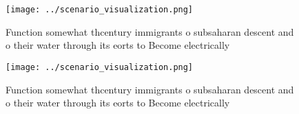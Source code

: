 \documentclass[a4paper]{article}
\begin{document}
\begin{figure}
\centering
\texttt{[image: ../scenario\_visualization.png]}
\caption{Function somewhat thcentury immigrants o subsaharan descent and o their water through its eorts to Become electrically 
}
\end{figure}
 
\begin{figure}
\centering
\texttt{[image: ../scenario\_visualization.png]}
\caption{Function somewhat thcentury immigrants o subsaharan descent and o their water through its eorts to Become electrically 
}
\end{figure}
 
\end{document}
